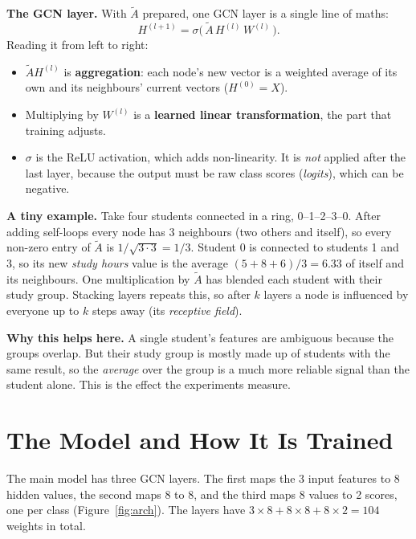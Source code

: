 \documentclass[11pt,a4paper]{article}
\newcommand{\Anorm}{\tilde{A}}
\begin{document}
\textbf{The GCN layer.} With $\Anorm$ prepared, one GCN layer is a single line of maths:
\begin{equation}
  H^{(l+1)} = \sigma\big(\,\Anorm\, H^{(l)}\, W^{(l)}\,\big).
\end{equation}
Reading it from left to right:
\begin{itemize}
  \item $\Anorm H^{(l)}$ is \textbf{aggregation}: each node's new vector is a weighted average of its own and its neighbours' current vectors ($H^{(0)} = X$).
  \item Multiplying by $W^{(l)}$ is a \textbf{learned linear transformation}, the part that training adjusts.
  \item $\sigma$ is the ReLU activation, which adds non-linearity. It is \emph{not} applied after the last layer, because the output must be raw class scores (\emph{logits}), which can be negative.
\end{itemize}

\textbf{A tiny example.} Take four students connected in a ring, 0--1--2--3--0. After adding self-loops every node has 3 neighbours (two others and itself), so every non-zero entry of $\Anorm$ is $1/\sqrt{3 \cdot 3} = 1/3$. Student 0 is connected to students 1 and 3, so its new \emph{study hours} value is the average $(5 + 8 + 6)/3 = 6.33$ of itself and its neighbours. One multiplication by $\Anorm$ has blended each student with their study group. Stacking layers repeats this, so after $k$ layers a node is influenced by everyone up to $k$ steps away (its \emph{receptive field}).

\textbf{Why this helps here.} A single student's features are ambiguous because the groups overlap. But their study group is mostly made up of students with the same result, so the \emph{average} over the group is a much more reliable signal than the student alone. This is the effect the experiments measure.

\section{The Model and How It Is Trained}

The main model has three GCN layers. The first maps the 3 input features to 8 hidden values, the second maps 8 to 8, and the third maps 8 values to 2 scores, one per class (Figure~\ref{fig:arch}). The layers have $3{\times}8 + 8{\times}8 + 8{\times}2 = 104$ weights in total.
\end{document}
